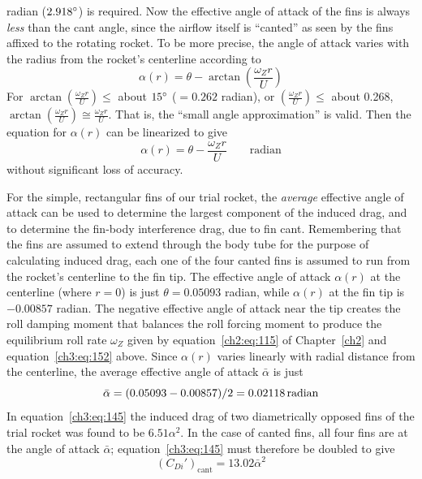 radian ($2.918^{\circ}$) is required. Now the effective angle of attack of the fins is always
\emph{less} than the cant angle, since the airflow itself is ``canted'' as seen by the fins affixed
to the rotating rocket. To be more precise, the angle of attack varies with the radius from the
rocket's centerline according to
\begin{equation*}
\alpha(r) = \theta - \arctan\left(\frac{\omega_Z r}{U}\right)
\end{equation*}
For $\arctan\left(\frac{\omega_Z r}{U}\right) \le$ about $15^{\circ}$ ($= 0.262$ radian), or
$\left(\frac{\omega_Z r}{U}\right) \le$ about 0.268,
$\arctan\left(\frac{\omega_Z r}{U}\right) \cong \frac{\omega_Z r}{U}$.
That is, the ``small angle approximation'' is valid. Then the equation for $\alpha(r)$ can be
linearized to give
\begin{equation}\label{ch3:eq:153}
\alpha(r) = \theta - \frac{\omega_Z r}{U} \qquad \text{radian}
\end{equation}
without significant loss of accuracy.

For the simple, rectangular fins of our trial rocket, the \emph{average} effective angle of attack
can be used to determine the largest component of the induced drag, and to determine the fin-body
interference drag, due to fin cant. Remembering that the fins are assumed to extend through the
body tube for the purpose of calculating induced drag, each one of the four canted fins is assumed
to run from the rocket's centerline to the fin tip. The effective angle of attack $\alpha(r)$ at the
centerline (where $r = 0$) is just $\theta = 0.05093$ radian, while $\alpha(r)$ at the fin tip is
$-0.00857$ radian. The negative effective angle of attack near the tip creates the roll damping
moment that balances the roll forcing moment to produce the equilibrium roll rate $\omega_Z$ given
by equation~\eqref{ch2:eq:115} of Chapter~\ref{ch2} and equation~\eqref{ch3:eq:152} above. Since
$\alpha(r)$ varies linearly with radial distance from the centerline, the average effective angle
of attack $\bar{\alpha}$ is just
\begin{equation*}
\bar{\alpha} = (0.05093 - 0.00857)/2 = 0.02118\,\mathrm{radian}
\end{equation*}
In equation~\eqref{ch3:eq:145} the induced drag of two diametrically opposed fins of the trial
rocket was found to be $6.51\alpha^2$. In the case of canted fins, all four fins are at the angle
of attack $\bar{\alpha}$; equation~\eqref{ch3:eq:145} must therefore be doubled to give
\begin{equation}\label{ch3:eq:154}
(C_{Di}')_{\mathrm{cant}} = 13.02\bar{\alpha}^2
\end{equation}

